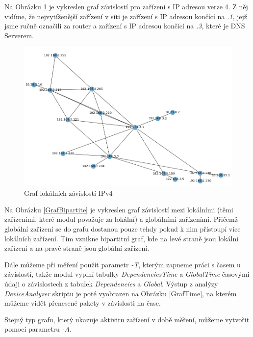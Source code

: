 \documentclass[thesis=B,czech,hidelinks]{FITthesis}[2019/03/21]
\begin{document}
    
    Na Obrázku \ref{GrafIPv4} je vykreslen graf závislostí pro zařízení s IP adresou verze 4. Z něj vidíme, že nejvytíženější zařízení v síti je zařízení s IP adresou končící na \emph{.1}, jejž jsme ručně označili za router a zařízení s IP adresou končící na \emph{.3}, které je DNS Serverem. 
    
    \begin{figure}[h!]
        \centering
        \includegraphics[width=\textwidth]{FITKancl_IPv4.jpg}
        \caption[Ukázka měření: Graf lokálních závislostí IPv4 pro síť v kanceláři]{Graf lokálních závislostí IPv4}
        \label{GrafIPv4}
    \end{figure}
    Na Obrázku \ref{GrafBipartite} je vykreslen graf závislostí mezi lokálními (těmi zařízeními, které modul považuje za lokální) a globálními zařízeními. Přičemž globální zařízení se do grafu dostanou pouze tehdy pokud k nim přistoupí více lokálních zařízení. Tím vznikne bipartitní graf, kde na levé straně jsou lokální zařízení a na pravé straně jsou globální zařízení.
    
    Dále můžeme při měření použít parametr \emph{-T}, kterým zapneme práci s časem u závislostí, takže modul vyplní tabulky \emph{DependenciesTime} a \emph{GlobalTime} časovými údaji o závislostech z tabulek \emph{Dependencies} a \emph{Global}. Výstup z analýzy \emph{DeviceAnalyzer} skriptu je poté vyobrazen na Obrázku \ref{GrafTime}, na kterém můžeme vidět přenesené pakety v závislosti na čase.
    
    Stejný typ grafu, který ukazuje aktivitu zařízení v době měření, můžeme vytvořit pomocí parametru \emph{-A}.
    \newpage
    
\end{document}
